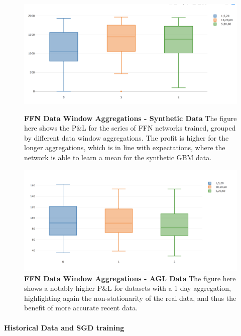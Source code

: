 \documentclass[a4paper,latin]{paper}
\begin{document}
\begin{figure}[H]
	\centering
	\begin{minipage}{0.45\textwidth}
		\centering 
		\includegraphics[scale=0.3]{images/iteration_four/it4_ffn_deltas.png}
		\caption{\textbf{FFN Data Window Aggregations - Synthetic Data} 
			\newline The figure here shows the P\&L for the series of FFN networks trained, grouped by different data window aggregations. The profit is higher for the longer aggregations, which is in line with expectations, where the network is able to learn a mean for the synthetic GBM data.}
		\label{figure-it5_ffn_deltas}
	\end{minipage}\hfill
	\begin{minipage}{0.45\textwidth}
		\centering \includegraphics[scale=0.3]{images/iteration_five/it5_delta_ffn.png}
		\caption{\textbf{FFN Data Window Aggregations - AGL Data} 
			\newline The figure here shows a notably higher P\&L for datasets with a 1 day aggregation, highlighting again the non-stationarity of the real data, and thus the benefit of more accurate recent data.}
		\label{figure-it5_delta_ffn}
	\end{minipage}
\end{figure}


\paragraph{Historical Data and SGD training}
\end{document}

